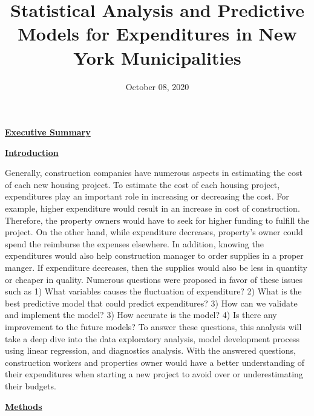 \documentclass[11pt]{article}\usepackage[]{graphicx}\usepackage[]{color}
\title{Statistical Analysis and Predictive Models for Expenditures in New York Municipalities\vspace{-5ex}}
\date{October 08, 2020\vspace{-5ex}}
\begin{document}
 
\maketitle








\noindent\textbf{\underline{Executive Summary}} 
\hfill \break

\noindent\textbf{\underline{Introduction}} 

\noindent Generally, construction companies have numerous aspects in estimating the cost of each new housing project. To estimate the cost of each housing project, expenditures play an important role in increasing or decreasing the cost. For example, higher expenditure would result in an increase in cost of construction. Therefore, the property owners would have to seek for higher funding to fulfill the project. On the other hand, while expenditure decreases, property’s owner could spend the reimburse the expenses elsewhere. In addition, knowing the expenditures would also help construction manager to order supplies in a proper manger. If expenditure decreases, then the supplies would also be less in quantity or cheaper in quality. Numerous questions were proposed in favor of these issues such as 1) What variables causes the fluctuation of expenditure? 2) What is the best predictive model that could predict expenditures? 3) How can we validate and implement the model? 3) How accurate is the model? 4) Is there any improvement to the future models? To answer these questions, this analysis will take a deep dive into the data exploratory analysis, model development process using linear regression, and diagnostics analysis. With the answered questions, construction workers and properties owner would have a better understanding of their expenditures when starting a new project to avoid over or underestimating their budgets.
\hfill \break

\noindent\textbf{\underline{Methods}} 
\end{document}
